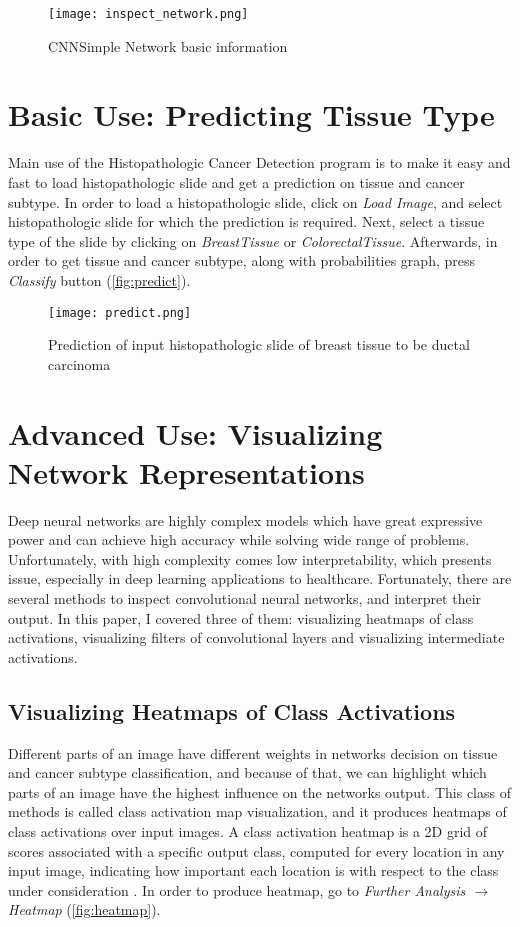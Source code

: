 \begin{figure}[h]
	\centering
	\texttt{[image: inspect\_network.png]}
	\caption{CNNSimple Network basic information}
	\label{fig:inspectmodel}
\end{figure}

\section{Basic Use: Predicting Tissue Type}

Main use of the Histopathologic Cancer Detection program is to make it easy and fast to load histopathologic slide and get a prediction on tissue and cancer subtype. In order to load a histopathologic slide, click on \emph{Load\; Image}, and select histopathologic slide for which the prediction is required. Next, select a tissue type of the slide by clicking on \emph{Breast\;Tissue} or \emph{Colorectal\;Tissue}. Afterwards, in order to get tissue and cancer subtype, along with probabilities graph, press \emph{Classify} button (\textcolor{red}{\autoref{fig:predict}}).

\begin{figure}[h]
	\centering
	\texttt{[image: predict.png]}
	\caption{Prediction of input histopathologic slide of breast tissue to be ductal carcinoma}
	\label{fig:predict}
\end{figure}

\section{Advanced Use: Visualizing Network Representations}

Deep neural networks are highly complex models which have great expressive power and can achieve high accuracy while solving wide range of problems. Unfortunately, with high complexity comes low interpretability, which presents issue, especially in deep learning applications to healthcare. Fortunately, there are several methods to inspect convolutional neural networks, and interpret their output. In this paper, I covered three of them: visualizing heatmaps of class activations, visualizing filters of convolutional layers and visualizing intermediate activations.

\subsection{Visualizing Heatmaps of Class Activations}

Different parts of an image have different weights in networks decision on tissue and cancer subtype classification, and because of that, we can highlight which parts of an image have the highest influence on the networks output. This class of methods is called class activation map visualization, and it produces heatmaps of class activations over input images. A class activation heatmap is a 2D grid of scores associated with a specific output class, computed for every location in any input image, indicating how important each location is with respect to the class under consideration \cite{chollet2018deep}. In order to produce heatmap, go to \emph{Further Analysis $\rightarrow$ Heatmap} (\textcolor{red}{\autoref{fig:heatmap}}).

